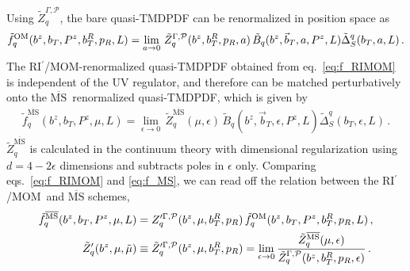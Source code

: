 \documentclass[11pt,a4paper]{article}
\DeclareRobustCommand{\eq}[1]{eq.~\eqref{eq:#1}}
\DeclareRobustCommand{\eqs}[2]{eqs.~\eqref{eq:#1} and \eqref{eq:#2}}
\newcommand{\MS}{{\overline{\mathrm{MS}}}}
\newcommand{\eps}{\epsilon}
\newcommand{\cP}{\mathcal{P}}
\newcommand{\nn}{\nonumber}
\newcommand{\bt}{\vec b_T}
\newcommand{\RIpMOM}{RI$^\prime$/MOM}
\begin{document}
Using $\tilde{Z}^{\Gamma,\cP}_q$, the bare quasi-TMDPDF can be renormalized in position space as
\begin{align} \label{eq:f_RIMOM}
 \tilde f_q^{\rm OM}(b^z, b_T, P^z, b_T^R, p_R, L)
 = \lim_{a\to 0} \, \tilde{Z}^{\Gamma,\cP}_q(b^z,b_T^R,p_R,a) \, \tilde B_q(b^z, \bt, a, P^z, L) \tilde \Delta_S^q(b_T,a,L)
\,.\end{align}
The \RIpMOM-renormalized quasi-TMDPDF obtained from \eq{f_RIMOM} is independent of the UV regulator,
and therefore can be matched perturbatively onto the $\MS$~renormalized quasi-TMDPDF, which is given by
\begin{align} \label{eq:f_MS}
 \tilde f_q^\MS(b^z, b_T, P^z, \mu, L)
 = \lim_{\eps\to 0} \, \tilde Z_q^\MS(\mu,\eps) \, \tilde B_q(b^z, \bt, \eps, P^z, L) \tilde \Delta_S^q(b_T,\eps,L)
\,.\end{align}
$\tilde Z_q^\MS$ is calculated in the continuum theory with dimensional regularization using $d=4-2\eps$ dimensions and subtracts poles in $\eps$ only.
Comparing \eqs{f_RIMOM}{f_MS}, we can read off the relation between the \RIpMOM~and $\MS$ schemes,
\begin{align} \label{eq:Zf_RIMOM_MS}
 \tilde f_q^\MS(b^z, b_T, P^z, \mu, L) &= Z_q^{\prime \Gamma,\cP}(b^z,\mu,b_T^R,p_R) \, \tilde f_q^{\rm OM}(b^z, b_T, P^z, b_T^R, p_R, L)
\,,\nn\\
 \tilde Z_q^\prime(b^z, \mu, \tilde\mu) &\equiv \tilde Z_q^{\prime \Gamma,\cP}(b^z,\mu,b_T^R,p_R)
 = \lim_{\eps\to0} \frac{\tilde Z_q^\MS(\mu,\eps)}{\tilde Z^{\Gamma,\cP}_q(b^z, b_T^R,p_R, \eps)}
\,.\end{align}
\end{document}
